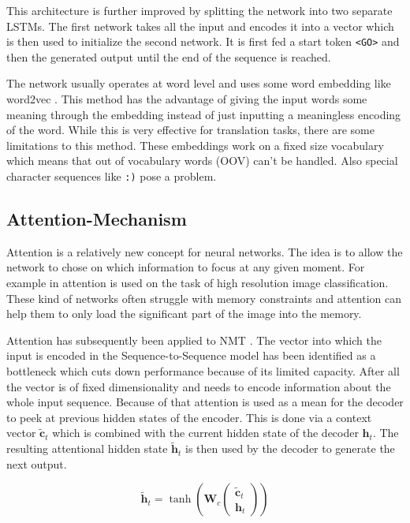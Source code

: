 This architecture is further improved by splitting the network into two separate LSTMs. The first network takes all the input and encodes it into a vector which is then used to initialize the second network. It is first fed a start token \texttt{<GO>} and then the generated output until the end of the sequence is reached.

The network usually operates at word level and uses some word embedding like word2vec \cite{word2vec}. This method has the advantage of giving the input words some meaning through the embedding instead of just inputting a meaningless encoding of the word. While this is very effective for translation tasks, there are some limitations to this method. These embeddings work on a fixed size vocabulary which means that out of vocabulary words (OOV) can't be handled. Also special character sequences like \texttt{:)} pose a problem.

\subsection{Attention-Mechanism}

Attention is a relatively new concept for neural networks. The idea is to allow the network to chose on which information to focus at any given moment. For example in \cite{visual_attention} attention is used on the task of high resolution image classification. These kind of networks often struggle with memory constraints and attention can help them to only load the significant part of the image into the memory.

Attention has subsequently been applied to NMT \cite{attention_luong,attention_bahdanau}. The vector into which the input is encoded in the Sequence-to-Sequence model has been identified as a bottleneck which cuts down performance because of its limited capacity. After all the vector is of fixed dimensionality and needs to encode information about the whole input sequence. Because of that attention is used as a mean for the decoder to peek at previous hidden states of the encoder. This is done via a context vector \(\tilde{\mathbf{c}}_t\) which is combined with the current hidden state of the decoder \(\mathbf{h}_t\). The resulting attentional hidden state \(\tilde{\mathbf{h}}_t\) is then used by the decoder to generate the next output.

\begin{equation*}
  \tilde{\mathbf{h}}_t = \tanh \left(\mathbf{W}_c \begin{pmatrix} \tilde{\mathbf{c}}_t \\ \mathbf{h}_{t} \end{pmatrix} \right)
\end{equation*}

